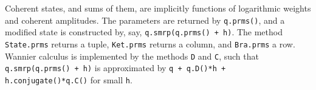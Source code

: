 Coherent states, and sums of them, are implicitly functions of logarithmic weights and coherent amplitudes.  The parameters are returned by {\tt q.prms()}, and a modified state is constructed by, say, {\tt q.smrp(q.prms() + h)}.  The method {\tt State.prms} returns a tuple, {\tt Ket.prms} returns a column, and {\tt Bra.prms} a row.  Wannier calculus is implemented by the methods {\tt D} and {\tt C}, such that {\tt q.smrp(q.prms() + h)} is approximated by {\tt q + q.D()*h + h.conjugate()*q.C()} for small {\tt h}.  

\bye